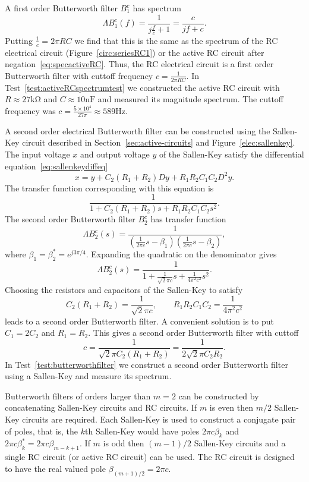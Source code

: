 A first order Butterworth filter $B_1^c$ has spectrum 
\[
\Lambda B_1^c(f) = \frac{1}{j\tfrac{f}{c} + 1} = \frac{c}{jf + c}.
\]  
Putting $\tfrac{1}{c} = 2\pi RC$ we find that this is the same as the spectrum of the RC electrical circuit (Figure~\ref{circ:seriesRC1}) or the active RC circuit after negation~\eqref{eq:specactiveRC}.  Thus, the RC electrical circuit is a first order Butterworth filter with cuttoff frequency $c = \tfrac{1}{2\pi RC}$.  In Test~\ref{test:activeRCspectrumtest} we constructed the active RC circuit with $R \approx 27\si{\kilo\ohm}$ and $C \approx 10\si{\nano\farad}$ and measured its magnitude spectrum.  The cuttoff frequency was $c = \tfrac{5\times10^4}{27\pi} \approx 589\si{\hertz}$.

A second order electrical Butterworth filter can be constructed using the Sallen-Key circuit described in Section~\ref{sec:active-circuits} and Figure~\ref{elec:sallenkey}.  The input voltage $x$ and output voltage $y$ of the Sallen-Key satisfy the differential equation~\eqref{eq:sallenkeydiffeq}
\[
x = y + C_2(R_1 + R_2) D y + R_1 R_2 C_1 C_2 D^2 y.
\]
The transfer function corresponding with this equation is
\[
\frac{1}{1 + C_2(R_1 + R_2) s + R_1 R_2 C_1 C_2 s^2}.
\]
The second order Butterworth filter $B_2^c$ has transfer function
\[
\Lambda B_2^c(s) = \frac{1}{(\tfrac{1}{2\pi c}s - \beta_1)(\tfrac{1}{2\pi c}s - \beta_2)},
\]
where $\beta_1 = \beta_2^* = e^{j3\pi/4}$.  Expanding the quadratic on the denominator gives
\[
\Lambda B_2^c(s) = \frac{1}{1 + \tfrac{1}{\sqrt{2} \pi c} s + \tfrac{1}{4\pi^2 c^2} s^2}.
\]
Choosing the resistors and capacitors of the Sallen-Key to satisfy 
\[
C_2(R_1 + R_2) = \frac{1}{ \sqrt{2} \pi c}, \qquad R_1 R_2 C_1 C_2 = \frac{1}{4\pi^2 c^2}
\]
leads to a second order Butterworth filter.  A convenient solution is to put $C_1 = 2C_2$ and $R_1 = R_2$.  This gives a second order Butterworth filter with cuttoff
\[
c = \frac{1}{\sqrt{2} \pi C_2(R_1+R_2)} =  \frac{1}{2\sqrt{2} \pi C_2 R_2}.
\]
In Test~\ref{test:butterworthfilter} we construct a second order Butterworth filter using a Sallen-Key and measure its spectrum.

Butterworth filters of orders larger than $m=2$ can be constructed by concatenating Sallen-Key circuits and RC circuits.  If $m$ is even then $m/2$ Sallen-Key circuits are required.  Each Sallen-Key is used to construct a conjugate pair of poles, that is, the $k$th Sallen-Key would have poles $2\pi c\beta_k$ and $2\pi c\beta_k^* = 2\pi c \beta_{m-k+1}$.  If $m$ is odd then $(m-1)/2$ Sallen-Key circuits and a single RC circuit (or active RC circuit) can be used.  The RC circuit is designed to have the real valued pole $\beta_{(m+1)/2} = 2\pi c$.

